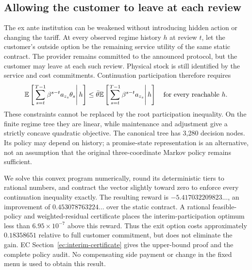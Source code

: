 \subsection{Allowing the customer to leave at each review}\label{sec:interim}
The ex ante institution can be weakened without introducing hidden action or changing the tariff. At every observed regime history $h$ at review $t$, let the customer's outside option be the remaining service utility of the same static contract. The provider remains committed to the announced protocol, but the customer may leave at each such review. Physical stock is still identified by the service and cost commitments. Continuation participation therefore requires
\begin{equation}\label{eq:interim}
 \mathbb E\left[\left.\sum_{s=t}^{T-1}\beta^{s-t}a_{z_s}\theta_s\right|h\right]
 \leq\bar\theta\mathbb E\left[\left.\sum_{s=t}^{T-1}\beta^{s-t}a_{z_s}\right|h\right]
 \quad\text{for every reachable }h.
\end{equation}
These constraints cannot be replaced by the root participation inequality. On the finite regime tree they are linear, while maintenance and adjustment give a strictly concave quadratic objective. The canonical tree has 3,280 decision nodes. Its policy may depend on history; a promise-state representation is an alternative, not an assumption that the original three-coordinate Markov policy remains sufficient.

We solve this convex program numerically, round its deterministic tiers to rational numbers, and contract the vector slightly toward zero to enforce every continuation inequality exactly. The resulting reward is $-5.417032209823\ldots$, an improvement of $0.453078763224\ldots$ over the static contract. A rational feasible-policy and weighted-residual certificate places the interim-participation optimum less than $6.95\times10^{-7}$ above this reward. Thus the exit option costs approximately $0.18358651$ relative to full customer commitment, but does not eliminate the gain. EC Section~\ref{ec:interim-certificate} gives the upper-bound proof and the complete policy audit. No compensating side payment or change in the fixed menu is used to obtain this result.
